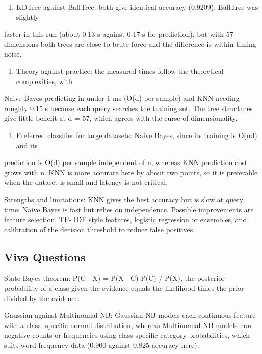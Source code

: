 \documentclass[11pt]{article}
\begin{document}
\begin{enumerate}
\item KDTree against BallTree: both give identical accuracy (0.9209); BallTree was slightly
\end{enumerate}
faster in this run (about 0.13 s against 0.17 s for prediction), but with 57 dimensions both
trees are close to brute force and the difference is within timing noise.

\begin{enumerate}
\item Theory against practice: the measured times follow the theoretical complexities, with
\end{enumerate}
Naive Bayes predicting in under 1 ms (O(d) per sample) and KNN needing roughly 0.15 s
because each query searches the training set. The tree structures give little benefit at d =
57, which agrees with the curse of dimensionality.

\begin{enumerate}
\item Preferred classifier for large datasets: Naive Bayes, since its training is O(nd) and its
\end{enumerate}
prediction is O(d) per sample independent of n, whereas KNN prediction cost grows with n.
KNN is more accurate here by about two points, so it is preferable when the dataset is small
and latency is not critical.

Strengths and limitations: KNN gives the best accuracy but is slow at query time; Naive
Bayes is fast but relies on independence. Possible improvements are feature selection, TF-
IDF style features, logistic regression or ensembles, and calibration of the decision
threshold to reduce false positives.

\subsection*{Viva Questions}
\label{sec:orga29d8f2}


State Bayes theorem: P(C | X) = P(X | C) P(C) / P(X), the posterior probability of a class
given the evidence equals the likelihood times the prior divided by the evidence.

Gaussian against Multinomial NB: Gaussian NB models each continuous feature with a class-
specific normal distribution, whereas Multinomial NB models non-negative counts or
frequencies using class-specific category probabilities, which suits word-frequency data
(0.900 against 0.825 accuracy here).
\end{document}
